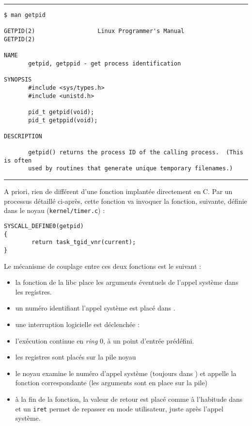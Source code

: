 \begin{center}\rule{3in}{0.4pt}\end{center}
\begin{Verbatim}
$ man getpid

GETPID(2)                  Linux Programmer's Manual                 GETPID(2)

NAME
       getpid, getppid - get process identification

SYNOPSIS
       #include <sys/types.h>
       #include <unistd.h>

       pid_t getpid(void);
       pid_t getppid(void);

DESCRIPTION

       getpid() returns the process ID of the calling process.  (This is often
       used by routines that generate unique temporary filenames.)
\end{Verbatim}
\begin{center}\rule{3in}{0.4pt}\end{center}

A priori, rien de différent d'une fonction implantée directement en C. Par un
processus détaillé ci-après, cette fonction va invoquer la fonction, suivante,
définie dans le noyau (\texttt{kernel/timer.c}) :

\begin{Verbatim}
SYSCALL_DEFINE0(getpid)
{
        return task_tgid_vnr(current);
}
\end{Verbatim}

Le mécanisme de couplage entre ces deux fonctions est le suivant :

\begin{itemize}
\item
  la fonction de la libc place les arguments éventuels de l'appel
  système dans les registres.
\item
  un numéro identifiant l'appel système est placé dans \eax.
\item
  une interruption logicielle est déclenchée :
\item
  l'exécution continue en \emph{ring} 0, à un point d'entrée prédéfini.
\item 
  les registres sont placés sur la pile noyau
\item
  le noyau examine le numéro d'appel système (toujours dans \eax) et appelle la
  fonction correspondante (les arguments sont en place sur la pile)
\item
  à la fin de la fonction, la valeur de retour est placé comme à l'habitude dans
  \eax et un \texttt{iret} permet de repasser en mode utilisateur, juste après
  l'appel système.
\end{itemize}


